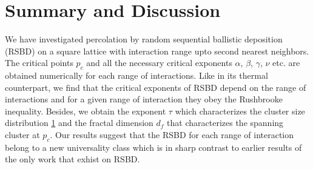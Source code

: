 
\chapter{Summary and Discussion}
We have investigated percolation by random sequential ballistic deposition (RSBD) on a square lattice 
with interaction range upto second nearest neighbors. The critical points $p_c$ and all the necessary critical exponents $\alpha$, $\beta$, $\gamma$, $\nu$ etc. are obtained numerically for each range of interactions. Like  in its thermal counterpart, we find that the critical exponents of RSBD depend on the range of interactions and for a given range of interaction they obey the Rushbrooke inequality. Besides, we obtain the exponent $\tau$ which characterizes the cluster size distribution \ref{} and the fractal dimension $d_f$ that characterizes the spanning cluster at $p_c$. Our results suggest that the RSBD for each range of interaction belong to a new universality class which is in sharp contrast to earlier results of the only work that exhist on RSBD.\\

